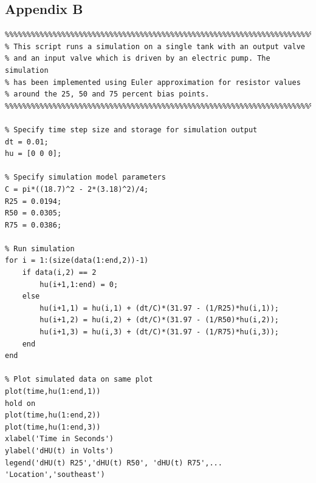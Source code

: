\documentclass{article}
\begin{document}
\newpage

\subsection{Appendix B}

\begin{lstlisting}
%%%%%%%%%%%%%%%%%%%%%%%%%%%%%%%%%%%%%%%%%%%%%%%%%%%%%%%%%%%%%%%%%%%%%%%%%%
% This script runs a simulation on a single tank with an output valve
% and an input valve which is driven by an electric pump. The simulation
% has been implemented using Euler approximation for resistor values
% around the 25, 50 and 75 percent bias points.
%%%%%%%%%%%%%%%%%%%%%%%%%%%%%%%%%%%%%%%%%%%%%%%%%%%%%%%%%%%%%%%%%%%%%%%%%%
	
% Specify time step size and storage for simulation output
dt = 0.01;
hu = [0 0 0];
	
% Specify simulation model parameters
C = pi*((18.7)^2 - 2*(3.18)^2)/4;
R25 = 0.0194;
R50 = 0.0305;
R75 = 0.0386;
	
% Run simulation
for i = 1:(size(data(1:end,2))-1)
	if data(i,2) == 2
		hu(i+1,1:end) = 0;
	else
		hu(i+1,1) = hu(i,1) + (dt/C)*(31.97 - (1/R25)*hu(i,1));
		hu(i+1,2) = hu(i,2) + (dt/C)*(31.97 - (1/R50)*hu(i,2));
		hu(i+1,3) = hu(i,3) + (dt/C)*(31.97 - (1/R75)*hu(i,3));
	end
end
	
% Plot simulated data on same plot
plot(time,hu(1:end,1))
hold on
plot(time,hu(1:end,2))
plot(time,hu(1:end,3))
xlabel('Time in Seconds')
ylabel('dHU(t) in Volts')
legend('dHU(t) R25','dHU(t) R50', 'dHU(t) R75',...
'Location','southeast')
\end{lstlisting}

\end{document}
